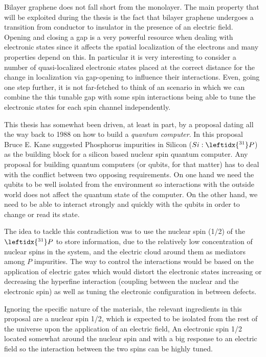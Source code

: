 Bilayer graphene does not fall short from the monolayer. The main property that will be exploited during the thesis is the fact that bilayer graphene undergoes a transition from conductor to insulator in the presence of an electric field.
Opening and closing a gap is a very powerful resource when dealing with electronic states since it affects the spatial localization of the electrons and many properties depend on this. In particular it is very interesting to consider a number of quasi-localized electronic states placed at the correct distance for the change in localization via gap-opening to influence their interactions.
Even, going one step further, it is not far-fetched to think of an scenario in which we can combine the this tunable gap with some spin interactions being able to tune the electronic states for each spin channel independently.
\bigskip


\newpage
This thesis has somewhat been driven, at least in part, by a proposal dating all the way back to 1988\cite{Kane1988} on how to build a \emph{quantum computer}. In this proposal Bruce E. Kane suggested Phosphorus impurities in Silicon ($Si: \leftidx{^{31}}P$) as the building block for a silicon based nuclear spin quantum computer.
Any proposal for building quantum computers (or qubits, for that matter) has to deal with the conflict between two opposing requirements. On one hand we need the qubits to be well isolated from the environment so interactions with the outside world does not affect the quantum state of the computer. On the other hand, we need to be able to interact strongly and quickly with the qubits in order to change or read its state.

The idea to tackle this contradiction was to use the nuclear spin (1/2) of the $\leftidx{^{31}}P$ to store information, due to the relatively low concentration of nuclear spins in the system, and the electric cloud around them as mediators among $P$ impurities.
The way to control the interactions would be based on the application of electric gates which would distort the electronic states increasing or decreasing the hyperfine interaction (coupling between the nuclear and the electronic spin) as well as tuning the electronic configuration in between defects.
\medbreak

Ignoring the specific nature of the materials, the relevant ingredients in this proposal are a nuclear spin 1/2, which is expected to be isolated from the rest of the universe upon the application of an electric field, An electronic spin 1/2 located somewhat around the nuclear spin and with a big response to an electric field so the interaction between the two spins can be highly tuned.



